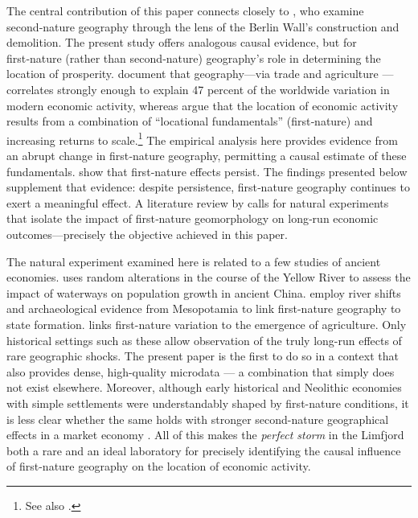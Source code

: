 \documentclass[12pt]{article}
\begin{document}
The central contribution of this paper connects closely to \cite{Ahlfeldt2015}, who examine second‑nature geography through the lens of the Berlin Wall’s construction and demolition. The present study offers analogous causal evidence, but for first‑nature (rather than second‑nature) geography’s role in determining the location of prosperity. \cite{Henderson2018satelite} document that geography—via trade and agriculture — correlates strongly enough to explain 47 percent of the worldwide variation in modern economic activity, whereas \cite{Davis2002} argue that the location of economic activity results from a combination of “locational fundamentals” (first‑nature) and increasing returns to scale.\footnote{See also \cite{Ager2020a, Cermeno2019, Brakman2004Bombs}.} 
The empirical analysis here provides evidence from an abrupt change in first‑nature geography, permitting a causal estimate of these fundamentals. \cite{Bleakley2012} show that first‑nature effects persist. The findings presented below supplement that evidence: despite persistence, first‑nature geography continues to exert a meaningful effect. A literature review by \cite{Bosker2022} calls for natural experiments that isolate the impact of first‑nature geomorphology on long‑run economic outcomes—precisely the objective achieved in this paper.

The natural experiment examined here is related to a few studies of ancient economies. \cite{Seror2020Random} uses random alterations in the course of the Yellow River to assess the impact of waterways on population growth in ancient China. \cite{Allen2023} employ river shifts and archaeological evidence from Mesopotamia to link first-nature geography to state formation. \cite{Matranga2024} links first-nature variation to the emergence of agriculture. Only historical settings such as these allow observation of the truly long-run effects of rare geographic shocks. The present paper is the first to do so in a context that also provides dense, high-quality microdata — a combination that simply does not exist elsewhere. Moreover, although early historical and Neolithic economies with simple settlements were understandably shaped by first-nature conditions, it is less clear whether the same holds with stronger second-nature geographical effects in a market economy \citep{Krugman1991, Krugman1999}. All of this makes the \textit{perfect storm} in the Limfjord both a rare and an ideal laboratory for precisely identifying the causal influence of first-nature geography on the location of economic activity.
\end{document}
